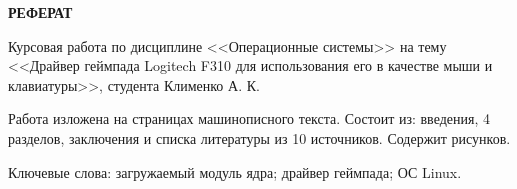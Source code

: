 \begin{center}
    {\bfseries\Large РЕФЕРАТ}
\end{center}

Курсовая работа по дисциплине <<Операционные системы>> на тему <<Драйвер геймпада Logitech F310 для использования его в качестве мыши и клавиатуры>>, студента Клименко А. К.

Работа изложена на \pageref{LastPage} страницах машинописного текста. Состоит из: введения, 4 разделов, заключения и списка литературы из 10 источников. Содержит \totalfigures{} рисунков.

Ключевые слова: загружаемый модуль ядра; драйвер геймпада; ОС Linux.

\pagebreak
